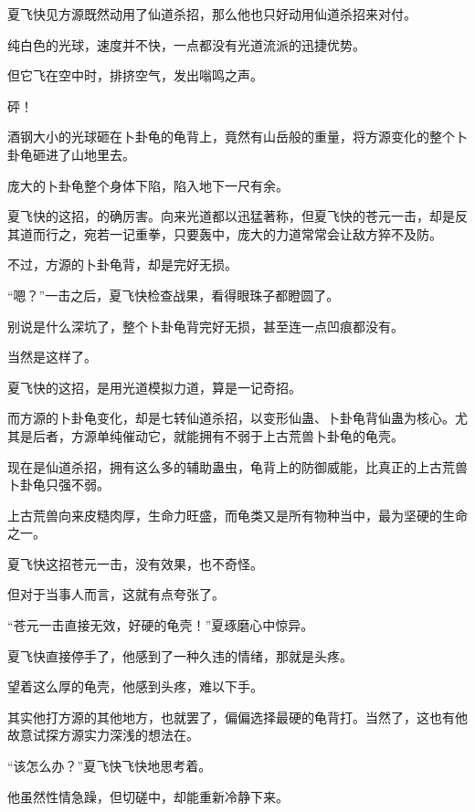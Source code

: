 
\begin{this_body}



夏飞快见方源既然动用了仙道杀招，那么他也只好动用仙道杀招来对付。

纯白色的光球，速度并不快，一点都没有光道流派的迅捷优势。

但它飞在空中时，排挤空气，发出嗡鸣之声。

砰！

酒钢大小的光球砸在卜卦龟的龟背上，竟然有山岳般的重量，将方源变化的整个卜卦龟砸进了山地里去。

庞大的卜卦龟整个身体下陷，陷入地下一尺有余。

夏飞快的这招，的确厉害。向来光道都以迅猛著称，但夏飞快的苍元一击，却是反其道而行之，宛若一记重拳，只要轰中，庞大的力道常常会让敌方猝不及防。

不过，方源的卜卦龟背，却是完好无损。

“嗯？”一击之后，夏飞快检查战果，看得眼珠子都瞪圆了。

别说是什么深坑了，整个卜卦龟背完好无损，甚至连一点凹痕都没有。

当然是这样了。

夏飞快的这招，是用光道模拟力道，算是一记奇招。

而方源的卜卦龟变化，却是七转仙道杀招，以变形仙蛊、卜卦龟背仙蛊为核心。尤其是后者，方源单纯催动它，就能拥有不弱于上古荒兽卜卦龟的龟壳。

现在是仙道杀招，拥有这么多的辅助蛊虫，龟背上的防御威能，比真正的上古荒兽卜卦龟只强不弱。

上古荒兽向来皮糙肉厚，生命力旺盛，而龟类又是所有物种当中，最为坚硬的生命之一。

夏飞快这招苍元一击，没有效果，也不奇怪。

但对于当事人而言，这就有点夸张了。

“苍元一击直接无效，好硬的龟壳！”夏琢磨心中惊异。

夏飞快直接停手了，他感到了一种久违的情绪，那就是头疼。

望着这么厚的龟壳，他感到头疼，难以下手。

其实他打方源的其他地方，也就罢了，偏偏选择最硬的龟背打。当然了，这也有他故意试探方源实力深浅的想法在。

“该怎么办？”夏飞快飞快地思考着。

他虽然性情急躁，但切磋中，却能重新冷静下来。


\end{this_body}
